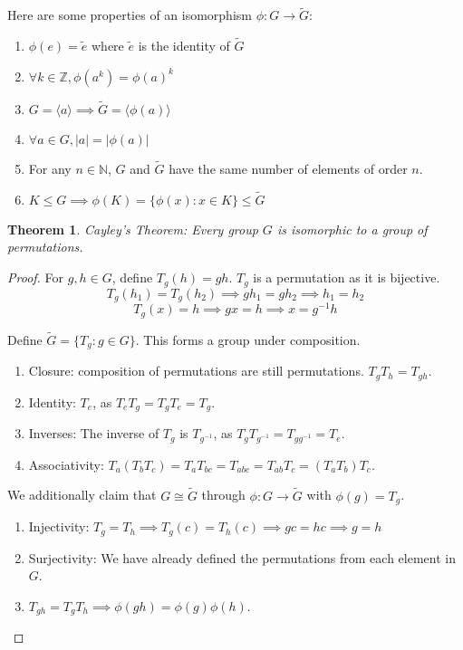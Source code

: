 \documentclass{article}
\theoremstyle{definition}
\theoremstyle{plain}
\newtheorem{theorem}{Theorem}
\theoremstyle{corollary}
\theoremstyle{lemma}
\begin{document}
Here are some properties of an isomorphism $\phi:G\rightarrow\tilde{G}$:
\begin{enumerate}
    \item $\phi(e)=\tilde{e}$ where $\tilde{e}$ is the identity of $\tilde{G}$
    \item $\forall k\in\mathbb{Z},\phi(a^k)=\phi(a)^k$
    \item $G=\langle a\rangle\implies\tilde{G}=\langle\phi(a)\rangle$
    \item $\forall a\in G,|a|=|\phi(a)|$
    \item For any $n\in\mathbb{N}$, $G$ and $\tilde{G}$ have the same number of elements of order $n$.
    \item $K\leq G\implies\phi(K)=\{\phi(x):x\in K\}\leq\tilde{G}$
\end{enumerate}

\begin{theorem}
    Cayley's Theorem: Every group $G$ is isomorphic to a group of permutations.
\end{theorem}

\begin{proof}
For $g,h\in G$, define $T_g(h)=gh$. $T_g$ is a permutation as it is bijective.
\[T_g(h_1)=T_g(h_2)\implies gh_1=gh_2\implies h_1=h_2\]
\[T_g(x)=h\implies gx=h\implies x=g^{-1}h\]

Define $\tilde{G}=\{T_g:g\in G\}$. This forms a group under composition.

\begin{enumerate}
    \item Closure: composition of permutations are still permutations. $T_gT_h=T_{gh}$.
    \item Identity: $T_e$, as $T_eT_g=T_gT_e=T_g$.
    \item Inverses: The inverse of $T_g$ is $T_{g^{-1}}$, as $T_gT_{g^{-1}}=T_{gg^{-1}}=T_e$.
    \item Associativity: $T_a(T_bT_c)=T_aT_{bc}=T_{abc}=T_{ab}T_c=(T_aT_b)T_c$.
\end{enumerate}

We additionally claim that $G\cong\tilde{G}$ through $\phi:G\rightarrow\tilde{G}$ with $\phi(g)=T_g$.
\begin{enumerate}
    \item Injectivity: $T_g=T_h\implies T_g(c)=T_h(c)\implies gc=hc\implies g=h$
    \item Surjectivity: We have already defined the permutations from each element in $G$.
    \item $T_{gh}=T_gT_h\implies\phi(gh)=\phi(g)\phi(h)$.
\end{enumerate}
\end{proof}
\end{document}
